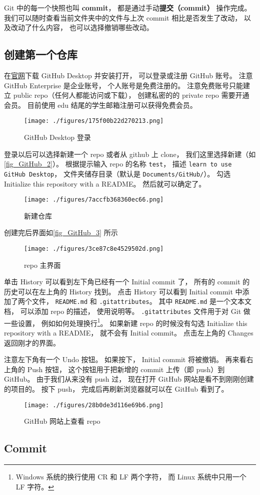 Git 中的每一个快照也叫 \textbf{commit}， 都是通过手动\textbf{提交（commit）} 操作完成。 我们可以随时查看当前文件夹中的文件与上次 commit 相比是否发生了改动， 以及改动了什么内容， 也可以选择撤销哪些改动。
 
\subsection{创建第一个仓库}
在\href{https://desktop.github.com/}{官网}下载 GitHub Desktop 并安装打开， 可以登录或注册 GitHub 账号。 注意 GitHub Enterprise 是企业账号， 个人账号是免费注册的。 注意免费账号只能建立 public repo（任何人都能访问或下载）， 创建私密的的 private repo 需要开通会员。 目前使用 edu 结尾的学生邮箱注册可以获得免费会员。

\begin{figure}[ht]
\centering
\texttt{[image: ./figures/175f00b22d270213.png]}
\caption{GitHub Desktop 登录} \label{fig_GitHub_1}
\end{figure}

登录以后可以选择新建一个 repo 或者从 github 上 clone， 我们这里选择新建（如\autoref{fig_GitHub_2}）。 根据提示输入 repo 的名称 \verb|test|， 描述 \verb|learn to use GitHub Desktop|， 文件夹储存目录（默认是 \verb|Documents/GitHub/|）。 勾选 Initialize this repository with a README。 然后就可以确定了。

\begin{figure}[ht]
\centering
\texttt{[image: ./figures/7accfb368360ec66.png]}
\caption{新建仓库} \label{fig_GitHub_2}
\end{figure}

创建完后界面如\autoref{fig_GitHub_3} 所示
\begin{figure}[ht]
\centering
\texttt{[image: ./figures/3ce87c8e4529502d.png]}
\caption{repo 主界面} \label{fig_GitHub_3}
\end{figure}

单击 History 可以看到左下角已经有一个 Initial commit 了， 所有的 commit 的历史可以在左上角的 History 找到。 点击 History 可以看到 Initial commit 中添加了两个文件， \verb|README.md| 和 \verb|.gitattributes|。 其中 \verb|README.md| 是一个文本文档， 可以添加 repo 的描述， 使用说明等。 \verb|.gitattributes| 文件用于对 Git 做一些设置， 例如如何处理换行\footnote{Windows 系统的换行使用 CR 和 LF 两个字符， 而 Linux 系统中只用一个 LF 字符。}。 如果新建 repo 的时候没有勾选 Initialize this repository with a README， 就不会有 Initial commit。 点击左上角的 Changes 返回刚才的界面。

注意左下角有一个 Undo 按钮。 如果按下， Initial commit 将被撤销。 再来看右上角的 Push 按钮， 这个按钮用于把新增的 commit 上传（即 push）到 GitHub。 由于我们从来没有 push 过， 现在打开 GitHub 网站是看不到刚刚创建的项目的。 按下 push， 完成后再刷新浏览器就可以在 GitHub 看到了。
\begin{figure}[ht]
\centering
\texttt{[image: ./figures/28b0de3d116e69b6.png]}
\caption{GitHub 网站上查看 repo} \label{fig_GitHub_5}
\end{figure}

\subsection{Commit}
